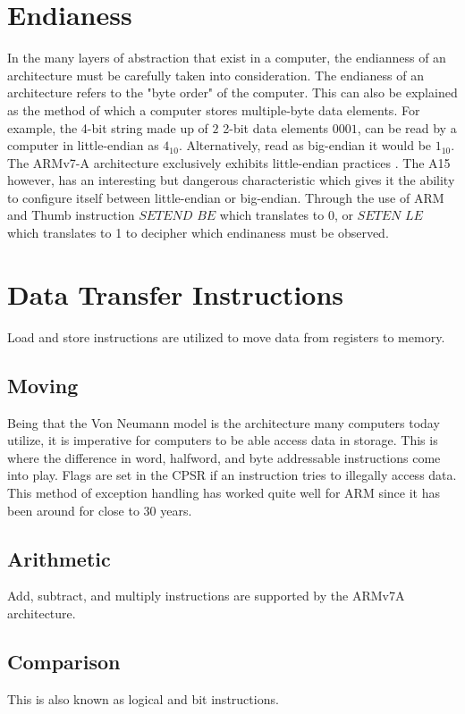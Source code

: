\documentclass[12pt]{scrreprt}
\begin{document}
	\section{Endianess}
	In the many layers of abstraction that exist in a computer, the endianness of an architecture must be carefully taken into consideration.
	The endianess of an architecture refers to the "byte order" of the computer.
	This can also be explained as the method of which a computer stores multiple-byte data elements.
	For example, the 4-bit string made up of $2$ 2-bit data elements $0001$, can be read by a computer in little-endian as $4_{10}$. 
	Alternatively, read as big-endian it would be $1_{10}$.
	The ARMv7-A architecture exclusively exhibits little-endian practices \autocite[A2-53]{a7man}.
	The A15 however, has an interesting but dangerous characteristic which gives it the ability to configure itself between little-endian or big-endian.
	Through the use of ARM and Thumb instruction $SETEND$ $BE$ which translates to 0, or $SETEN$ $LE$ which translates to 1 to decipher which endinaness must be observed.

	\section{Data Transfer Instructions}
	Load and store instructions are utilized to move data from registers to memory.

	\subsection{Moving}
	Being that the Von Neumann model is the architecture many computers today utilize, it is imperative for computers to be able access data in storage.
	This is where the difference in word, halfword, and byte addressable instructions come into play.
	Flags are set in the CPSR if an instruction tries to illegally access data.
	This method of exception handling has worked quite well for ARM since it has been around for close to 30 years.

	\subsection{Arithmetic}
		Add, subtract, and multiply instructions are supported by the ARMv7A architecture.
	\subsection{Comparison}
		This is also known as logical and bit instructions.
\end{document}
